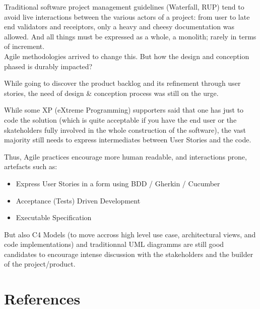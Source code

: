Traditional software project management guidelines (Waterfall, RUP) tend
to avoid live interactions between the various actors of a project: from
user to late end validators and receiptors, only a heavy and cheesy
documentation was allowed. And all things must be expressed as a whole,
a monolith; rarely in terms of increment.\\Agile methodologies arrived
to change this. But how the design and conception phased is durably
impacted?

While going to discover the product backlog and its refinement through
user stories, the need of design \& conception process was still on the
urge.

While some XP (eXtreme Programming) supporters said that one has just to
code the solution (which is quite acceptable if you have the end user or
the skateholders fully involved in the whole construction of the
software), the vast majority still needs to express intermediates
between User Stories and the code.

Thus, Agile practices encourage more human readable, and interactions
prone, artefacts such as:

\begin{itemize}
\itemsep1pt\parskip0pt
\item
  Express User Stories in a form using BDD / Gherkin / Cucumber\\
\item
  Acceptance (Tests) Driven Development\\
\item
  Executable Specification
\end{itemize}

But also C4 Models (to move accross high level use case, architectural
views, and code implementations) and traditionnal UML diagramms are
still good candidates to encourage intense discussion with the
stakeholders and the builder of the project/product.

\section{References}\label{references}

